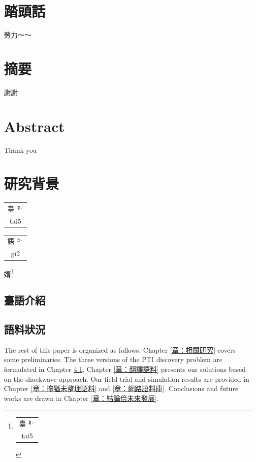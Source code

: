 \documentclass[final,oneside,onecolumn,12pt,a4paper]{book}%
\makeatletter
\newcommand{\rubybot}[2]{%
  \@tempdimc \f@size\p@
  \begin{tabular}[t]{@{}c@{}}
    #1\\[-3em]
    \fontsize{.8\@tempdimc}{.8\@tempdimc}\selectfont%
    \setlength{\normalbaselineskip}{0pt}#2 
  \end{tabular}%
}
\makeatother
\begin{document}
\frontmatter
\chapter{踏頭話}
勞力～～
\newpage

\chapter{摘要}
謝謝

\newpage

\chapter{Abstract}

Thank you

\newpage

\tableofcontents
\listoffigures
\listoftables



\mainmatter


\chapter{研究背景}
\label{章：研究背景}

\rubybot{臺 \includegraphics[height=1em]{圖/⿳⿳ㄉㄞˊ}}{tai5}
\rubybot{語 \includegraphics[height=1em]{圖/⿳⿳ㆣㄧˋ}}{gi2}
媠\footnote{\rubybot{臺 \includegraphics[height=1em]{圖/⿳⿳ㄉㄞˊ}}{tai5}}

\section{臺語介紹}
\label{章：臺語介紹}

\section{語料狀況}
\label{節：語料狀況}

The rest of this paper is organized as follows. Chapter
\ref{章：相關研究} covers some preliminaries.
The three versions of the PTI discovery problem are formulated in Chapter
\ref{章：臺語介紹}. Chapter \ref{章：翻譯語料} presents our
solutions based on the shockwave approach. Our field trial and simulation
results are provided in Chapter \ref{章：摻猶未整理語料} and
\ref{章：網路語料庫}. Conclusions and future works are drawn in Chapter
\ref{章：結論佮未來發展}.
\end{document}
